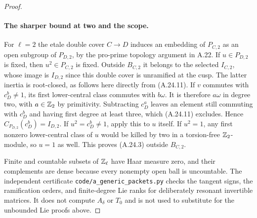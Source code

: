 \begin{proof}
\paragraph{The sharper bound at two and the scope.}
For $\ell=2$ the etale double cover $C\to D$ induces an
embedding of $P_{C,2}$ as an open subgroup of $P_{D,2}$,
by the pro-prime topology argument in A.22.
If $u\in P_{D,2}$ is fixed, then $u^2\in P_{C,2}$ is
fixed. Outside $B_{C,2}$ it belongs to the selected
$I_{C,2}$, whose image is $I_{D,2}$ since this double
cover is unramified at the cusp.
The latter inertia is root-closed, as follows here
directly from (A.24.11). If $v$ commutes with
$c_D^b\ne1$, its first lower-central class commutes with
$b\omega$. It is therefore $a\omega$ in degree two,
with $a\in\mathbb Z_2$ by primitivity. Subtracting $c_D^a$
leaves an element still commuting with $c_D^b$ and
having first degree at least three, which (A.24.11)
excludes. Hence $C_{P_{D,2}}(c_D^b)=I_{D,2}$.
If $u^2=c_D^b\ne1$, apply this to $u$ itself.
If $u^2=1$, any first nonzero lower-central class of
$u$ would be killed by two in a torsion-free
$\mathbb Z_2$-module, so $u=1$ as well.
This proves (A.24.3) outside $B_{C,2}$.

Finite and countable subsets of $\mathbb Z_\ell$ have Haar
measure zero, and their complements are dense because
every nonempty open ball is uncountable.
The independent certificate
\texttt{code/a\_generic\_packets.py} checks the tangent
signs, the ramification orders, and finite-degree Lie
ranks for deliberately resonant invertible matrices.
It does not compute $A_\delta$ or $T_0$ and is not used
to substitute for the unbounded Lie proofs above.
\end{proof}
